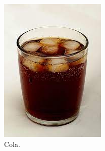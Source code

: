 \documentclass{article}
\begin{document}
	\begin{figure}[h!]
		\centering
		\begin{subfigure}[b]{0.4\linewidth}
		
		\includegraphics[width=\linewidth]{drink.jpg}
		    \caption{Cola.}
		\end{subfigure}
	    \begin{subfigure}[b]{0.4\linewidth}
	    	

\end{subfigure}
\end{figure}
\end{document}
